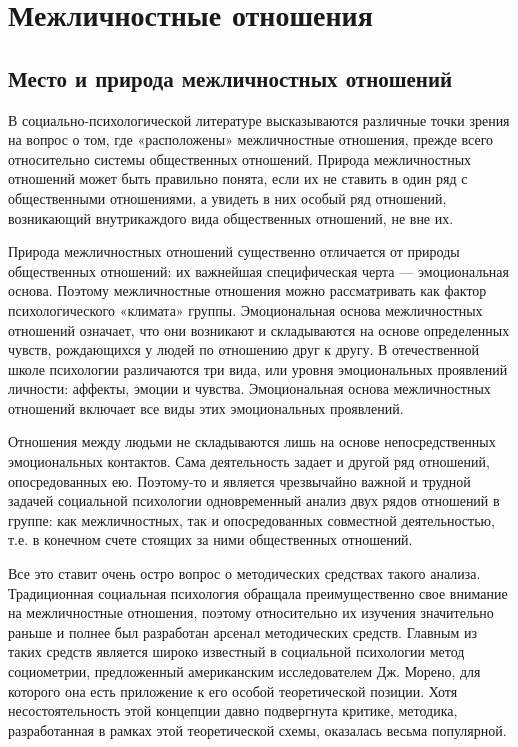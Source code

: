 \chapter{Межличностные отношения}
\section{Место и природа межличностных отношений}
В социально-психологической литературе высказываются различные точки зрения на вопрос о том, где «расположены» межличностные отношения, прежде всего относительно системы общественных отношений. Природа межличностных отношений может быть правильно понята, если их не ставить в один ряд с общественными отношениями, а увидеть в них особый ряд отношений, возникающий внутрикаждого вида общественных отношений, не вне их. 

Природа межличностных отношений существенно отличается от природы общественных отношений: их важнейшая специфическая черта — эмоциональная основа. Поэтому межличностные отношения можно рассматривать как фактор психологического «климата» группы. Эмоциональная основа межличностных отношений означает, что они возникают и складываются на основе определенных чувств, рождающихся у людей по отношению друг к другу. В отечественной школе психологии различаются три вида, или уровня эмоциональных проявлений личности: аффекты, эмоции и чувства. Эмоциональная основа межличностных отношений включает все виды этих эмоциональных проявлений. \cite{4}

Отношения между людьми не складываются лишь на основе непосредственных эмоциональных контактов. Сама деятельность задает и другой ряд отношений, опосредованных ею. Поэтому-то и является чрезвычайно важной и трудной задачей социальной психологии одновременный анализ двух рядов отношений в группе: как межличностных, так и опосредованных совместной деятельностью, т.е. в конечном счете стоящих за ними общественных отношений.

Все это ставит очень остро вопрос о методических средствах такого анализа. Традиционная социальная психология обращала преимущественно свое внимание на межличностные отношения, поэтому относительно их изучения значительно раньше и полнее был разработан арсенал методических средств. Главным из таких средств является широко известный в социальной психологии метод социометрии, предложенный американским исследователем Дж. Морено, для которого она есть приложение к его особой теоретической позиции. Хотя несостоятельность этой концепции давно подвергнута критике, методика, разработанная в рамках этой теоретической схемы, оказалась весьма популярной.

